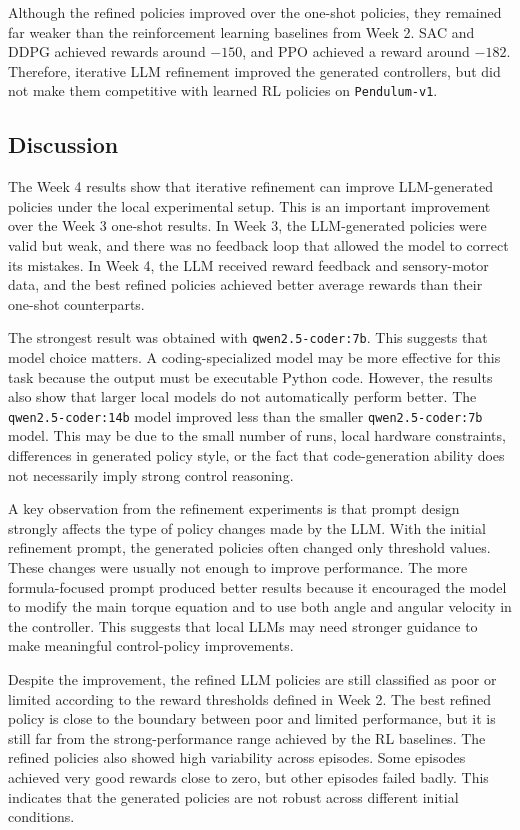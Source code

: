 \documentclass[11pt,a4paper]{article}
\begin{document}
Although the refined policies improved over the one-shot policies, they remained far weaker than the reinforcement learning baselines from Week 2. SAC and DDPG achieved rewards around $-150$, and PPO achieved a reward around $-182$. Therefore, iterative LLM refinement improved the generated controllers, but did not make them competitive with learned RL policies on \texttt{Pendulum-v1}.

\subsection{Discussion}

The Week 4 results show that iterative refinement can improve LLM-generated policies under the local experimental setup. This is an important improvement over the Week 3 one-shot results. In Week 3, the LLM-generated policies were valid but weak, and there was no feedback loop that allowed the model to correct its mistakes. In Week 4, the LLM received reward feedback and sensory-motor data, and the best refined policies achieved better average rewards than their one-shot counterparts.

The strongest result was obtained with \texttt{qwen2.5-coder:7b}. This suggests that model choice matters. A coding-specialized model may be more effective for this task because the output must be executable Python code. However, the results also show that larger local models do not automatically perform better. The \texttt{qwen2.5-coder:14b} model improved less than the smaller \texttt{qwen2.5-coder:7b} model. This may be due to the small number of runs, local hardware constraints, differences in generated policy style, or the fact that code-generation ability does not necessarily imply strong control reasoning.

A key observation from the refinement experiments is that prompt design strongly affects the type of policy changes made by the LLM. With the initial refinement prompt, the generated policies often changed only threshold values. These changes were usually not enough to improve performance. The more formula-focused prompt produced better results because it encouraged the model to modify the main torque equation and to use both angle and angular velocity in the controller. This suggests that local LLMs may need stronger guidance to make meaningful control-policy improvements.

Despite the improvement, the refined LLM policies are still classified as poor or limited according to the reward thresholds defined in Week 2. The best refined policy is close to the boundary between poor and limited performance, but it is still far from the strong-performance range achieved by the RL baselines. The refined policies also showed high variability across episodes. Some episodes achieved very good rewards close to zero, but other episodes failed badly. This indicates that the generated policies are not robust across different initial conditions.
\end{document}
